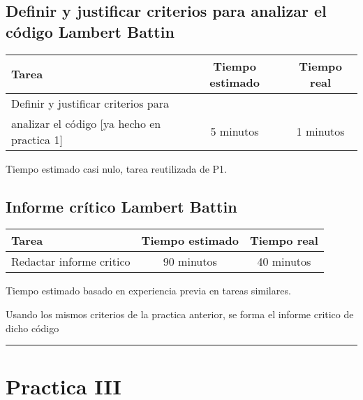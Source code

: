 \documentclass[12pt,a4paper]{article}
\newcommand{\separadorseccion}{%
    \vspace{1em}
    \hrule
    \vspace{1em}
}
\begin{document}
\subsection{Definir y justificar criterios para analizar el código Lambert Battin}
    \begin{center}
        \begin{tabular}{|l|c|c|}
            \hline
            \textbf{Tarea} & \textbf{Tiempo estimado} & \textbf{Tiempo real} \\
            \hline
            Definir y justificar criterios para \\analizar el código [ya hecho en practica 1] & 5 minutos & 1 minutos \\
            \hline
        \end{tabular}
    \end{center}
    \begin{center}
        Tiempo estimado casi nulo, tarea reutilizada de P1.
    \end{center}


\subsection{Informe crítico Lambert Battin}
    \begin{center}
        \begin{tabular}{|l|c|c|}
            \hline
            \textbf{Tarea} & \textbf{Tiempo estimado} & \textbf{Tiempo real} \\
            \hline
            Redactar informe critico & 90 minutos & 40 minutos \\
            \hline
        \end{tabular}
    \end{center}
    \begin{center}
        Tiempo estimado basado en experiencia previa en tareas similares.
    \end{center}
Usando los mismos criterios de la practica anterior, se forma el informe critico de dicho código


\separadorseccion

\section{Practica III}
\end{document}
